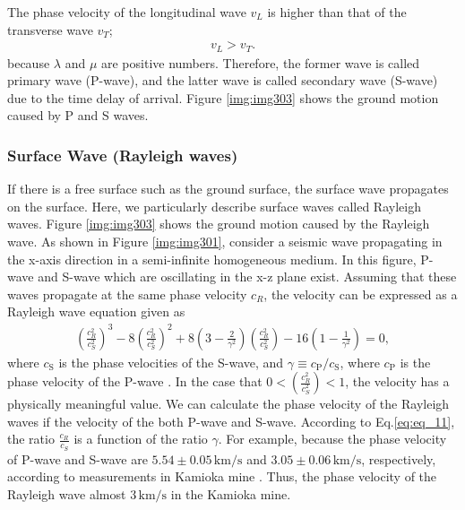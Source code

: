 The phase velocity of the longitudinal wave $v_{L}$ is higher than that of the transverse wave $v_{T}$;
\begin{eqnarray}
  v_{L} > v_{T}.\label{eq:eq_10}
\end{eqnarray}
because $\lambda$ and $\mu$ are positive numbers. Therefore, the former wave is called primary wave (P-wave), and the latter wave is called secondary wave (S-wave) due to the time delay of arrival. Figure \ref{img:img303} shows the ground motion caused by P and S waves.


\subsubsection{Surface Wave (Rayleigh waves)}
If there is a free surface such as the ground surface, the surface wave propagates on the surface. Here, we particularly describe surface waves called Rayleigh waves. Figure \ref{img:img303} shows the ground motion caused by the Rayleigh wave. As shown in Figure \ref{img:img301}, consider a seismic wave propagating in the x-axis direction in a semi-infinite homogeneous medium. In this figure, P-wave and S-wave which are oscillating in the x-z plane exist. Assuming that these waves propagate at the same phase velocity $c_{R}$, the velocity can be expressed as a Rayleigh wave equation given as
\begin{eqnarray}\label{eq:eq_11}
\left(\frac{c_{R}^{2}}{c_{S}^{2}}\right)^{3}-8\left(\frac{c_{R}^{2}}{c_{S}^{2}}\right)^{2}+8\left(3-\frac{2}{\gamma^2}\right)\left(\frac{c_{R}^{2}}{c_{S}^{2}}\right)-16\left(1-\frac{1}{\gamma^2}\right)=0,
\end{eqnarray}
where $c_{\mathrm{S}}$ is the phase velocities of the S-wave, and $\gamma\equiv c_{\mathrm{P}}/c_{\mathrm{S}}$, where $c_{\mathrm{P}}$ is the phase velocity of the P-wave \cite{hasegawa2015jishin}. In the case that $0 < (\frac{c_{R}^2}{c_{S}^2}) <1$, the velocity has a physically meaningful value. We can calculate the phase velocity of the Rayleigh waves if the velocity of the both P-wave and S-wave. According to Eq.\ref{eq:eq_11}, the ratio $\frac{c_R}{c_S}$ is a function of the ratio $\gamma$. For example, because the phase velocity of P-wave and S-wave are $5.54\pm0.05\,\mathrm{km/s}$ and $3.05\pm0.06\,\mathrm{km/s}$, respectively, according to measurements in Kamioka mine \cite{takemoto2003}. Thus, the phase velocity of the Rayleigh wave almost $3\,\mathrm{km/s}$ in the Kamioka mine. 

